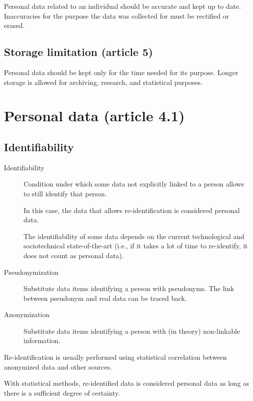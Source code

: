 Personal data related to an individual should be accurate and kept up to date. Inaccuracies for the purpose the data was collected for must be rectified or erased.


\subsection{Storage limitation (article 5)} 

Personal data should be kept only for the time needed for its purpose. Longer storage is allowed for archiving, research, and statistical purposes.



\section{Personal data (article 4.1)}


\subsection{Identifiability}

\begin{description}
    \item[Identifiability] 
        Condition under which some data not explicitly linked to a person allows to still identify that person.

        In this case, the data that allows re-identification is considered personal data.

        \begin{remark}
            The identifiability of some data depends on the current technological and sociotechnical state-of-the-art (i.e., if it takes a lot of time to re-identify, it does not count as personal data).
        \end{remark}

    \item[Pseudonymization] 
        Substitute data items identifying a person with pseudonyms. The link between pseudonym and real data can be traced back.

    \item[Anonymization] 
        Substitute data items identifying a person with (in theory) non-linkable information.
\end{description}

\begin{remark}
    Re-identification is usually performed using statistical correlation between anonymized data and other sources.
    
    With statistical methods, re-identified data is considered personal data as long as there is a sufficient degree of certainty.
\end{remark}

